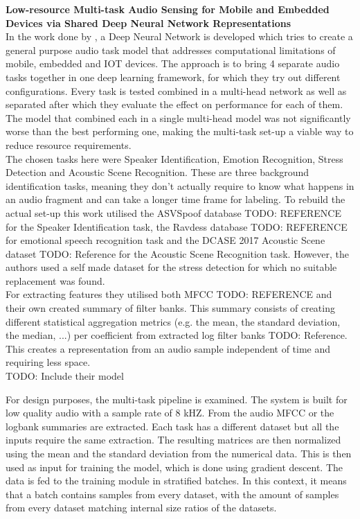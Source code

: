 
{\large \textbf{Low-resource Multi-task Audio Sensing for Mobile and Embedded Devices via Shared Deep Neural Network Representations}} \\

In the work done by \citep{georgiev2017low}, a Deep Neural Network is developed which tries to create a general purpose audio task model that addresses computational limitations of mobile, embedded and IOT devices. The approach is to bring 4 separate audio tasks together in one deep learning framework, for which they try out different configurations. Every task is tested combined in a multi-head network as well as separated after which they evaluate the effect on performance for each of them. The model that combined each in a single multi-head model was not significantly worse than the best performing one, making the multi-task set-up  a viable way to reduce resource requirements. \\

The chosen tasks here were Speaker Identification, Emotion Recognition, Stress Detection and Acoustic Scene Recognition. These are three background identification tasks, meaning they don't actually require to know what happens in an audio fragment and can take a longer time frame for labeling. To rebuild the actual set-up this work utilised the ASVSpoof database TODO: REFERENCE for the Speaker Identification task, the Ravdess database TODO: REFERENCE for emotional speech recognition task and the DCASE 2017 Acoustic Scene dataset TODO: Reference for the Acoustic Scene Recognition task. However, the authors used a self made dataset for the stress detection for which no suitable replacement was found. \\

For extracting features they utilised both MFCC TODO: REFERENCE and their own created summary of filter banks. This summary consists of creating different statistical aggregation metrics (e.g. the mean, the standard deviation, the median, ...) per coefficient from extracted log filter banks TODO: Reference. This creates a representation from an audio sample independent of time and requiring less space.\\

TODO: Include their model 

For design purposes, the multi-task pipeline is examined. The system is built for low quality audio with a sample rate of 8 kHZ. From the audio MFCC or the logbank summaries are extracted. Each task has a different dataset but all the inputs require the same extraction. The resulting matrices are then normalized using the mean and the standard deviation from the numerical data. This is then used as input for training the model, which is done using gradient descent. The data is fed to the training module in stratified batches. In this context, it means that a batch contains samples from every dataset, with the amount of samples from every dataset matching internal size ratios of the datasets. \\


